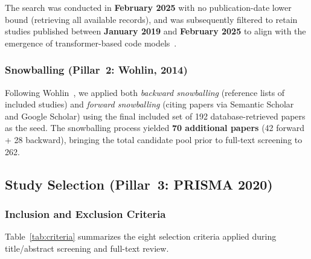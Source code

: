 The search was conducted in \textbf{February 2025} with no publication-date
lower bound (retrieving all available records), and was subsequently
filtered to retain studies published between \textbf{January 2019} and
\textbf{February 2025} to align with the emergence of transformer-based code
models~\cite{feng2020codebert}.

\subsubsection{Snowballing (Pillar~2: Wohlin, 2014)}

Following Wohlin~\cite{wohlin2014snowballing}, we applied both \emph{backward
snowballing} (reference lists of included studies) and \emph{forward
snowballing} (citing papers via Semantic Scholar and Google Scholar) using the
final included set of 192 database-retrieved papers as the seed. The snowballing
process yielded \textbf{70 additional papers} (42 forward + 28 backward),
bringing the total candidate pool prior to full-text screening to 262.

\subsection{Study Selection (Pillar~3: PRISMA 2020)}
\label{sec:selection}

\subsubsection{Inclusion and Exclusion Criteria}

Table~\ref{tab:criteria} summarizes the eight selection criteria applied during
title/abstract screening and full-text review.

